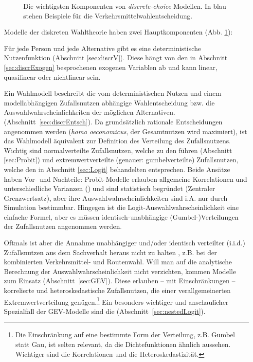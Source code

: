 \begin{figure}[t!]
\caption{\label{fig:discrKomp}Die wichtigsten Komponenten von
\textit{discrete-choice} Modellen. In blau stehen Beispiele f\"ur die
Verkehrsmittelwahlentscheidung. 
}
\end{figure}

Modelle der diskreten Wahltheorie haben zwei Hauptkomponenten
(Abb. \ref{fig:discrKomp}): 

\bi
\item F\"ur jede Person und jede Alternative gibt es eine deterministische
Nutzenfunktion (Abschnitt \ref{sec:discrV}). Diese h\"angt  von den in Abschnitt
\ref{sec:discrExogen} besprochenen exogenen Variablen ab und kann
linear, quasilinear oder nichtlinear sein.
\item Ein Wahlmodell beschreibt die vom deterministischen
Nutzen und einem modell\-abh\"angigen Zufallsnutzen 
abh\"angige Wahlentscheidung  bzw. die
Auswahlwahrscheinlichkeiten der m\"oglichen Alternativen.
(Abschnitt~\ref{sec:discrEntsch}).
\ei
Da grunds\"atzlich rationale Entscheidungen angenommen werden 
(\textit{homo oeconomicus}, der Gesamtnutzen wird maximiert), 
 ist das Wahlmodell \"aquivalent zur
Definition des Verteilung des Zufallsnutzens. Wichtig sind 
normalverteilte Zufallsnutzen, welche zu den 
f\"uhren (Abschnitt \ref{sec:Probit}) und extremwertverteilte
(genauer: gumbelverteilte)
Zufallsnutzen, welche den in Abschnitt \ref{sec:Logit} behandelten 
entsprechen. Beide Ans\"atze haben Vor- und Nachteile: Probit-Modelle
erlauben allgemeine Korrelationen und unterschiedliche Varianzen
() und sind statistisch begr\"undet
(Zentraler Grenzwertsatz), aber ihre Auswahlwahrscheinlichkeiten sind
i.A. nur durch Simulation bestimmbar. Hingegen ist die
Logit-Auswahlwahrscheinlichkeit eine einfache Formel, aber es m\"ussen
identisch-unabh\"angige (Gumbel-)Verteilungen der Zufallsnutzen
angenommen werden.

Oftmals ist aber die Annahme unabh\"angiger und/oder
identisch verteilter (i.i.d.) Zufallsnutzen aus dem Sachverhalt heraus
nicht zu halten ,
z.B. bei der kombinierten Verkehrsmittel- und Routenwahl. Will man auf
die analytische Berechnung der Auswahlwahrscheinlichkeit nicht
verzichten, kommen  Modelle zum Einsatz (Abschnitt~\ref{sec:GEV}). Diese erlauben -- mit
Einschr\"ankungen -- korrelierte und heteroskedastische Zufallsnutzen,
die einer verallgemeinerten Extremwertverteilung
gen\"ugen.\footnote{Die Einschr\"ankung auf eine bestimmte Form der
  Verteilung, z.B. Gumbel statt Gau\3, ist selten relevant, da die
  Dichtefunktionen \"ahnlich aussehen. Wichtiger sind die
  Korrelationen und die Heteroskedastizit\"at.} Ein besonders
wichtiger und anschaulicher Spezialfall der GEV-Modelle sind die 
  (Abschnitt~\ref{sec:nestedLogit}).

